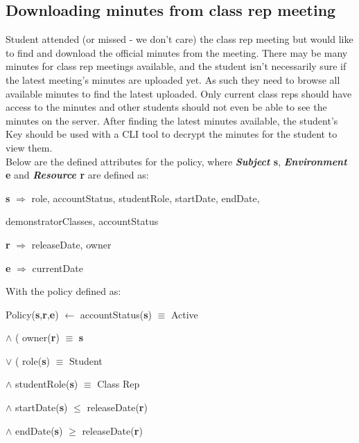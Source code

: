 \documentclass[a4paper,11pt]{article}
\begin{document}
\subsection{Downloading minutes from class rep meeting}
Student attended (or missed - we don't care) the class rep meeting but would like to find and download the official minutes from the meeting. There may be many minutes for class rep meetings available, and the student isn't necessarily sure if the latest meeting's minutes are uploaded yet. As such they need to browse all available minutes to find the latest uploaded. Only current class reps should have access to the minutes and other students should not even be able to see the minutes on the server. After finding the latest minutes available, the student's Key should be used with a CLI tool to decrypt the minutes for the student to view them.\\
Below are the defined attributes for the policy, where \textbf{\emph{Subject} s}, \textbf{\emph{Environment} e} and \textbf{\emph{Resource} r} are defined as:\\\par
\textbf{s} $\Rightarrow$ role, accountStatus, studentRole, startDate, endDate,\par
\hspace{0.8cm}demonstratorClasses, accountStatus\par
\textbf{r} $\Rightarrow$ releaseDate, owner\par
\textbf{e} $\Rightarrow$ currentDate\\\par
\noindent With the policy defined as:\\\par
Policy(\textbf{s},\textbf{r},\textbf{e}) $\leftarrow$ accountStatus(\textbf{s}) $\equiv$ Active\par
\hspace{2.2cm}$\wedge{}$ ( owner(\textbf{r}) $\equiv$ \textbf{s}\par
\hspace{2.9cm}$\vee{}$ ( role(\textbf{s}) $\equiv$ Student\par
\hspace{3.5cm}$\wedge{}$ studentRole(\textbf{s}) $\equiv$ Class Rep\par
\hspace{3.5cm}$\wedge{}$ startDate(\textbf{s}) $\leq$ releaseDate(\textbf{r})\par
\hspace{3.5cm}$\wedge{}$ endDate(\textbf{s}) $\geq$ releaseDate(\textbf{r})\par
\end{document}
